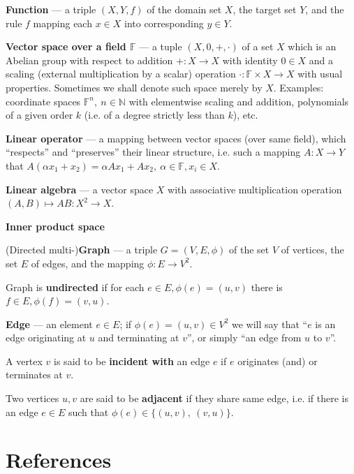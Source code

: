 \documentclass[14pt,a4paper]{extarticle}
\theoremstyle{definition}
\begin{document}
\textbf{Function} --- a triple \( (X, Y, f) \) of the domain set \( X \),
the target set \( Y \), and the rule \( f \) mapping each \( x\in X\)
into corresponding \( y\in Y \).

\textbf{Vector space over a field \(\mathbb{F}\) } --- a tuple \( (X, 0, +, \cdot) \)
of a set \( X \) which is an Abelian group with respect to addition \( +:X\to X\)
with identity \( 0\in X \) and a scaling (external multiplication by a scalar)
operation \(\cdot: \mathbb{F}\times X \to X \) with usual properties.
Sometimes we shall denote such space merely by \( X \).
Examples: coordinate spaces \( \mathbb{F}^n,\ n\in\mathbb{N} \) with elementwise
scaling and addition, polynomials of a given order \( k \) (i.e. of a degree
strictly less than \( k \)), etc.

\textbf{Linear operator} --- a mapping between vector spaces (over same field),
which ``respects'' and ``preserves'' their linear structure, i.e. such a mapping
\( A:X\to Y \) that \( A(\alpha x_1 + x_2) = \alpha Ax_1 + Ax_2,\
\alpha\in\mathbb{F}, x_i\in X \).

\textbf{Linear algebra} --- a vector space \( X \) with associative
multiplication operation \( (A, B)\mapsto AB: X^2\to X \).

\textbf{Inner product space}

(Directed multi-)\textbf{Graph} --- a triple \(G = (V, E, \phi)\)
of the set \( V \) of vertices, the set \( E \) of edges,
and the mapping \( \phi: E\to V^2\).

Graph is \textbf{undirected} if for each \( e\in E, \phi(e)=(u, v)\)
there is \( f\in E, \phi(f)=(v, u) \).

\textbf{Edge} --- an element \( e\in E \); if \( \phi(e) = (u, v)\in V^2 \)
we will say that ``\( e \) is an edge originating at \( u \) and terminating at \(
v \)'', or simply ``an edge from \( u \) to \( v \)''.

A vertex \( v \) is said to be \textbf{incident with} an edge \( e \)
if \( e \) originates (and) or terminates at \( v \).

Two vertices \( u, v\) are said to be \textbf{adjacent}
if they share same edge, i.e. if there is an edge \( e\in E \)
such that \( \phi(e)\in\{(u, v),\ (v, u) \}\).
\newpage
\section{References}
\nocite{*}
\printbibliography[heading=none]
\end{document}
